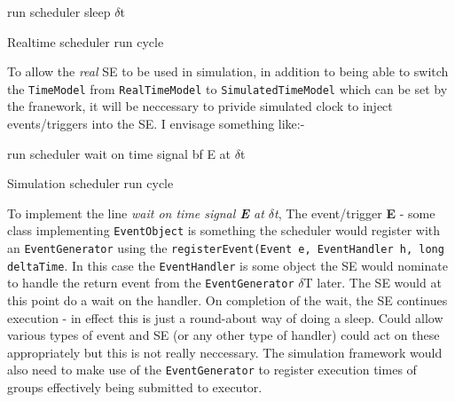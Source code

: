 \begin{algorithm}
\label{alg:schedrealrun}
\begin{algorithmic}
    \STATE run scheduler
    \STATE sleep $\delta$t 
  \ENDWHILE
\end{algorithmic}
\caption{Realtime scheduler run cycle}
\end{algorithm}

To allow the \emph{real} SE to be used in simulation, in addition to being able to switch the {\tt TimeModel} from {\tt RealTimeModel} to {\tt SimulatedTimeModel} which can be set by the franework, it will be neccessary to privide simulated clock to inject events/triggers into the SE. I envisage something like:-

\begin{algorithm}
\label{alg:schedsimrun}
\begin{algorithmic}
    \STATE run scheduler
    \STATE wait on time signal {bf E} at $\delta$t
  \ENDWHILE
\end{algorithmic}
\caption{Simulation scheduler run cycle}
\end{algorithm}

To implement the line \emph{wait on time signal {\bf E} at $\delta$t},  The event/trigger {\bf E} - some class implementing {\tt EventObject} is something the scheduler would register with an {\tt EventGenerator} using the {\tt registerEvent(Event e, EventHandler h, long deltaTime}. In this case the {\tt EventHandler} is some object the SE would nominate to handle the return event from the {\tt EventGenerator} $\delta$T later. The SE would at this point do a wait on the handler. On completion of the wait, the SE continues execution - in effect this is just a round-about way of doing a sleep. Could allow various types of event and SE (or any other type of handler) could act on these appropriately but this is not really neccessary. The simulation framework would also need to make use of the {\tt EventGenerator} to register execution times of groups effectively being submitted to executor. 



